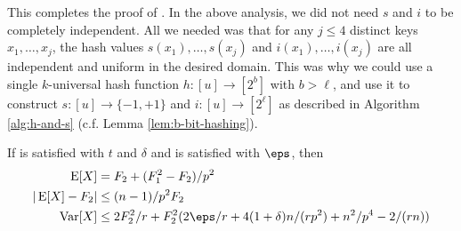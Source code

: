 This completes the proof of . In the above analysis, we
did not need $s$ and $i$ to be completely independent. All we needed
was that for any $j\leq 4$ distinct keys $x_1,\ldots,x_j$, the hash
values $s(x_1),\ldots,s(x_j)$ and $i(x_1),\ldots,i(x_j)$ are all
independent and uniform in the desired domain. This was why we could
use a single $k$-universal hash function $h:[u]\to[2^b]$ with
$b>\ell$, and use it to construct $s:[u]\to\{-1,+1\}$ and
$i:[u]\to[2^\ell]$ as described in Algorithm \ref{alg:h-and-s}
(c.f. Lemma \ref{lem:b-bit-hashing}).


\begin{lemma}
    If  is satisfied with $t$
    and $\delta$ and  is satisfied with
    $\eps$, then
    \begin{align}
        \E[X] &= F_2 + (F_1^2 - F_2)/p^2 \\
        | \E[X] - F_2 | &\le (n - 1)/p^2 F_2 \\
        \Var[X] &\le 2F_2^2/r + F_2^2 (2\eps/r + 4(1 + \delta)n / (rp^2) + n^2/p^4 - 2 /(rn))
    \end{align}
\end{lemma}
